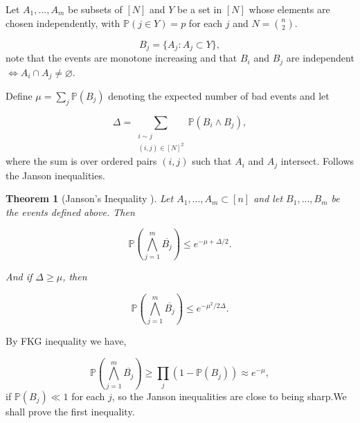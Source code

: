 \documentclass[12pt,twoside,a4paper,bibliography=totocnumbered]{book}
\numberwithin{equation}{section}
\let\emptyset=\varnothing
\newtheorem{theorem}             {Theorem}[section]
\theoremstyle{remark}
\begin{document}
Let $A_1, ... , A_m$ be subsets of $[N]$ and $Y$ be a set in $[N]$ whose elements are chosen independently, with $\mathbb{P}(j \in Y) = p$ for each $j$ and $N=\binom{n}{2}$. 

$$ B_j = \{A_j \colon A_j \subset Y\},$$
note that the events are monotone increasing and that $B_i$ and $B_j$ are independent $\iff A_i \cap A_j \neq \emptyset$. 

Define $\mu = \sum_j \mathbb{P}(B_j)$ denoting the expected number of bad events and let

$$ \Delta = \sum_{\substack{i\sim j\\ (i,j) \in [N]^2}} \mathbb{P}(B_i \wedge B_j), $$
where the sum is over ordered pairs $(i,j)$ such that $A_i$ and $A_j$ intersect. Follows the Janson inequalities.

\begin{theorem}[{Janson's Inequality \cite{Ja87}}]
Let $A_1,...,A_m \subset [n]$ and let $B_1,...,B_m$ be the events defined above. Then

$$ \mathbb{P}\left(\bigwedge_{j=1}^m \overline{B_j}\right) \leq e^{-\mu + \Delta/2}. $$

And if $\Delta \geq \mu$, then

$$ \mathbb{P}\left( \bigwedge_{j=1}^m \overline{B_j} \right) \leq e^{-\mu ^2 /2\Delta}.$$
\end{theorem}
By FKG inequality we have,

$$ \mathbb{P}\left( \bigwedge_{j=1}^m \overline{B_j} \right) \geq \prod_j (1-\mathbb{P}(B_j)) \approx e^{-\mu}, $$
if $\mathbb{P}(B_j) \ll 1$ for each $j$, so the Janson inequalities are close to being sharp.We shall prove the first inequality.
\end{document}
